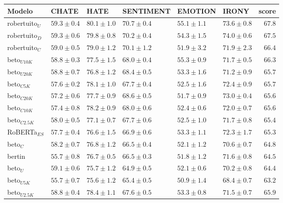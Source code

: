 \begin{table}
    \centering
    \begin{tabular}{llllllr}
        \toprule
        Modelo             & CHATE                   &  HATE              &  SENTIMENT        &  EMOTION          &  IRONY            &     score \\
        \midrule
        robertuito$_U$  & $59.3 \pm 0.4$ & $80.1 \pm 1.0$ & $70.7 \pm 0.4$ & $55.1 \pm 1.1$ & $73.6 \pm 0.8$ &  $67.8$ \\
        robertuito$_{D}$& $59.3 \pm 0.6$ & $79.8 \pm 0.8$ & $70.2 \pm 0.4$ & $54.3 \pm 1.5$ & $74.0 \pm 0.6$ &  $67.5$ \\
        robertuito$_C$  & $59.0 \pm 0.5$ & $79.0 \pm 1.2$ & $70.1 \pm 1.2$ & $51.9 \pm 3.2$ & $71.9 \pm 2.3$ &  $66.4$ \\
        beto$_{U10K}$   & $58.8 \pm 0.3$ & $77.5 \pm 1.5$ & $68.0 \pm 0.4$ & $55.3 \pm 0.9$ & $71.7 \pm 0.5$ &  $66.3$ \\
        beto$_{U20K}$   & $58.8 \pm 0.7$ & $76.8 \pm 1.2$ & $68.4 \pm 0.5$ & $53.3 \pm 1.6$ & $71.2 \pm 0.9$ &  $65.7$ \\
        beto$_{C5K}$    & $57.6 \pm 0.2$ & $78.1 \pm 1.0$ & $67.7 \pm 0.4$ & $52.5 \pm 1.6$ & $72.4 \pm 0.9$ &  $65.7$ \\
        beto$_{C20K}$   & $57.2 \pm 0.6$ & $77.7 \pm 0.9$ & $68.6 \pm 0.5$ & $51.7 \pm 0.9$ & $73.0 \pm 0.4$ &  $65.6$ \\
        beto$_{C10K}$   & $57.4 \pm 0.8$ & $78.2 \pm 0.9$ & $68.0 \pm 0.6$ & $52.4 \pm 0.6$ & $72.0 \pm 0.7$ &  $65.6$ \\
        beto$_{C2.5K}$  & $58.0 \pm 0.5$ & $77.1 \pm 0.7$ & $67.7 \pm 0.6$ & $52.5 \pm 1.0$ & $71.7 \pm 0.8$ &  $65.4$ \\
        RoBERTa$_{ES}$  & $57.7 \pm 0.4$ & $76.6 \pm 1.5$ & $66.9 \pm 0.6$ & $53.3 \pm 1.1$ & $72.3 \pm 1.7$ &  $65.3$ \\
        beto$_C$        & $58.2 \pm 0.7$ & $76.8 \pm 1.2$ & $66.5 \pm 0.4$ & $52.1 \pm 1.2$ & $70.6 \pm 0.7$ &  $64.8$ \\
        bertin          & $55.7 \pm 0.8$ & $76.7 \pm 0.5$ & $66.5 \pm 0.3$ & $51.8 \pm 1.2$ & $71.6 \pm 0.8$ &  $64.5$ \\
        beto$_U$        & $59.1 \pm 0.6$ & $75.7 \pm 1.2$ & $64.9 \pm 0.5$ & $52.1 \pm 0.6$ & $70.2 \pm 0.8$ &  $64.4$ \\
        beto$_{U5K}$    & $55.7 \pm 0.7$ & $75.6 \pm 1.2$ & $65.4 \pm 0.5$ & $50.9 \pm 1.4$ & $68.4 \pm 0.7$ &  $63.2$ \\
        beto$_{U2.5K}$  & $58.8 \pm 0.4$ & $78.4 \pm 1.1$ & $67.6 \pm 0.5$ & $53.3 \pm 0.8$ & $71.5 \pm 0.7$ &  $65.9$ \\


\end{tabular}
\end{table}
